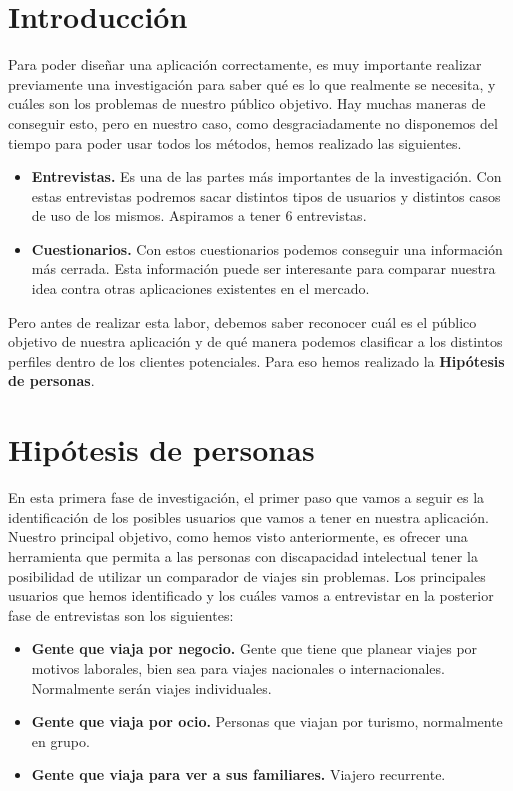 
\section{Introducción}

Para poder diseñar una aplicación correctamente, es muy importante realizar previamente una investigación para saber qué
es lo que realmente se necesita, y cuáles son los problemas de nuestro público objetivo. Hay muchas maneras de conseguir esto, pero en nuestro
caso, como desgraciadamente no disponemos del tiempo para poder usar todos los métodos, hemos realizado las siguientes.

\begin{itemize}
    \item \textbf{Entrevistas.} Es una de las partes más importantes de la investigación. Con estas entrevistas podremos sacar distintos tipos de usuarios y distintos casos de uso de los mismos. Aspiramos a tener 6 entrevistas.
    \item \textbf{Cuestionarios.} Con estos cuestionarios podemos conseguir una información más cerrada. Esta información puede ser interesante para comparar nuestra idea contra otras aplicaciones existentes en el mercado.
\end{itemize}



Pero antes de realizar esta labor, debemos saber reconocer cuál es el público objetivo de nuestra aplicación y
de qué manera podemos clasificar a los distintos perfiles dentro de los clientes potenciales. Para eso hemos realizado la
\textbf{Hipótesis de personas}.

\section{Hipótesis de personas}

En esta primera fase de investigación, el primer paso que vamos a seguir es la identificación de los posibles usuarios que vamos a tener
en nuestra aplicación. Nuestro principal objetivo, como hemos visto anteriormente, es ofrecer una herramienta que permita a las personas con
discapacidad intelectual tener la posibilidad de utilizar un comparador de viajes sin problemas. Los principales usuarios que hemos identificado
y los cuáles vamos a entrevistar en la posterior fase de entrevistas son los siguientes:

\begin{itemize}
    \item\textbf{Gente que viaja por negocio.} Gente que tiene que planear viajes por motivos laborales, bien sea para viajes nacionales o internacionales. Normalmente serán viajes individuales.
    \item\textbf{Gente que viaja por ocio.} Personas que viajan por turismo, normalmente en grupo.
    \item\textbf{Gente que viaja para ver a sus familiares.} Viajero recurrente.
\end{itemize}

